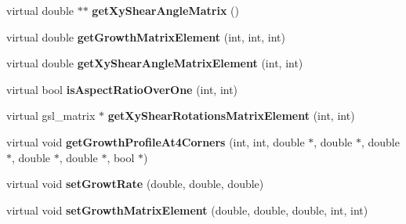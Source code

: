 \begin{DoxyCompactItemize}
\item 
\hypertarget{classGrowthFunctionBase_a32e0a776bc81147dc648662440d50b0d}{}virtual double $\ast$$\ast$ {\bfseries get\+Xy\+Shear\+Angle\+Matrix} ()\label{classGrowthFunctionBase_a32e0a776bc81147dc648662440d50b0d}

\item 
\hypertarget{classGrowthFunctionBase_aa70ed3e1b142f733364b8543e26e4ef8}{}virtual double {\bfseries get\+Growth\+Matrix\+Element} (int, int, int)\label{classGrowthFunctionBase_aa70ed3e1b142f733364b8543e26e4ef8}

\item 
\hypertarget{classGrowthFunctionBase_a2dbab9e82dc1b1511df64c9a7cdd2dac}{}virtual double {\bfseries get\+Xy\+Shear\+Angle\+Matrix\+Element} (int, int)\label{classGrowthFunctionBase_a2dbab9e82dc1b1511df64c9a7cdd2dac}

\item 
\hypertarget{classGrowthFunctionBase_ad3048194d1054d24d56bd4b3f178e802}{}virtual bool {\bfseries is\+Aspect\+Ratio\+Over\+One} (int, int)\label{classGrowthFunctionBase_ad3048194d1054d24d56bd4b3f178e802}

\item 
\hypertarget{classGrowthFunctionBase_a3cab7817a6f6d4f117f0c0c14334b0ab}{}virtual gsl\+\_\+matrix $\ast$ {\bfseries get\+Xy\+Shear\+Rotations\+Matrix\+Element} (int, int)\label{classGrowthFunctionBase_a3cab7817a6f6d4f117f0c0c14334b0ab}

\item 
\hypertarget{classGrowthFunctionBase_a7ce876504be72c0ed6d800aed092ac36}{}virtual void {\bfseries get\+Growth\+Profile\+At4\+Corners} (int, int, double $\ast$, double $\ast$, double $\ast$, double $\ast$, double $\ast$, bool $\ast$)\label{classGrowthFunctionBase_a7ce876504be72c0ed6d800aed092ac36}

\item 
\hypertarget{classGrowthFunctionBase_ac9995b11d7a4823d2d2c45a603b51916}{}virtual void {\bfseries set\+Growt\+Rate} (double, double, double)\label{classGrowthFunctionBase_ac9995b11d7a4823d2d2c45a603b51916}

\item 
\hypertarget{classGrowthFunctionBase_a8cf8a1604ced5f314707fd137e9a8d3e}{}virtual void {\bfseries set\+Growth\+Matrix\+Element} (double, double, double, int, int)\label{classGrowthFunctionBase_a8cf8a1604ced5f314707fd137e9a8d3e}

\end{DoxyCompactItemize}
